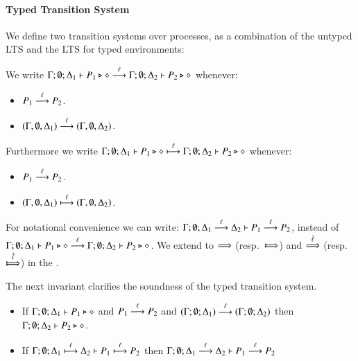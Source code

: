 \paragraph{Typed Transition System}

We define two transition systems over processes, as a combination
of the untyped LTS and the LTS for typed environments:

\begin{definition}\label{d:tlts}\rm
	We write
	$\Gamma; \emptyset; \Delta_1 \proves P_1 \hastype \Proc \by{\ell} \Gamma; \emptyset; \Delta_2 \proves P_2 \hastype \Proc$
	whenever:
%
	\begin{itemize}
		\item	$P_1 \by{\ell} P_2$.
		\item	$(\Gamma, \emptyset, \Delta_1) \by{\ell} (\Gamma, \emptyset, \Delta_2)$.
	\end{itemize}
%

	Furthermore we write
	$\Gamma; \emptyset; \Delta_1 \proves P_1 \hastype \Proc \hby{\ell} \Gamma; \emptyset; \Delta_2 \proves P_2 \hastype \Proc$
	whenever:
%
	\begin{itemize}
		\item	$P_1 \by{\ell} P_2$.
		\item	$(\Gamma, \emptyset, \Delta_1) \hby{\ell} (\Gamma, \emptyset, \Delta_2)$.
	\end{itemize}
%
\end{definition}

For notational convenience we can write:
$\horel{\Gamma}{\Delta_1}{P_1}{\by{\ell}}{\Delta_2}{P_2}$,
instead of $\Gamma; \emptyset; \Delta_1 \proves P_1 \hastype \Proc \by{\ell} \Gamma; \emptyset; \Delta_2 \proves P_2 \hastype \Proc$.
We extend to $\By{}$ (resp.\ $\Hby{}$) and $\By{\hat{\ell}}$ (resp.\ $\Hby{\hat{\ell}}$) in the .

The next invariant clarifies the soundness of the
typed transition system.

\begin{lemma}[Invariant]
	\begin{itemize}
		\item	If $\Gamma; \emptyset; \Delta_1 \proves P_1 \hastype \Proc$ and
			$P_1 \by{\ell} P_2$ and $(\Gamma; \emptyset; \Delta_1) \by{\ell} (\Gamma; \emptyset; \Delta_2)$
			then $\Gamma; \emptyset; \Delta_2 \proves P_2 \hastype \Proc$.

		\item	If $\horel{\Gamma}{\Delta_1}{P_1}{\hby{\ell}}{\Delta_2}{P_2}$
			then $\horel{\Gamma}{\Delta_1}{P_1}{\by{\ell}}{\Delta_2}{P_2}$

	\end{itemize}
\end{lemma}

